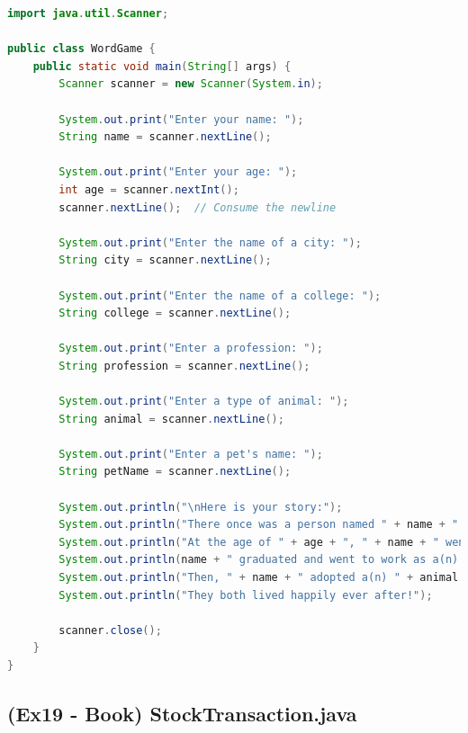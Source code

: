 \documentclass{article}
\begin{document}
\begin{lstlisting}[language=Java, caption=WordGame.java]
import java.util.Scanner;

public class WordGame {
    public static void main(String[] args) {
        Scanner scanner = new Scanner(System.in);

        System.out.print("Enter your name: ");
        String name = scanner.nextLine();

        System.out.print("Enter your age: ");
        int age = scanner.nextInt();
        scanner.nextLine();  // Consume the newline

        System.out.print("Enter the name of a city: ");
        String city = scanner.nextLine();

        System.out.print("Enter the name of a college: ");
        String college = scanner.nextLine();

        System.out.print("Enter a profession: ");
        String profession = scanner.nextLine();

        System.out.print("Enter a type of animal: ");
        String animal = scanner.nextLine();

        System.out.print("Enter a pet's name: ");
        String petName = scanner.nextLine();

        System.out.println("\nHere is your story:");
        System.out.println("There once was a person named " + name + " who lived in " + city + ".");
        System.out.println("At the age of " + age + ", " + name + " went to college at " + college + ".");
        System.out.println(name + " graduated and went to work as a(n) " + profession + ".");
        System.out.println("Then, " + name + " adopted a(n) " + animal + " named " + petName + ".");
        System.out.println("They both lived happily ever after!");

        scanner.close();
    }
}
\end{lstlisting}

\subsection*{(Ex19 - Book) StockTransaction.java}
\end{document}
